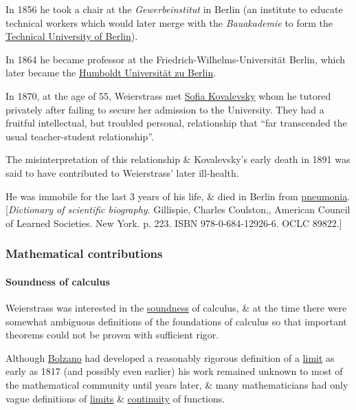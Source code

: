 \documentclass{article}
\begin{document}
In 1856 he took a chair at the \textit{Gewerbeinstitut} in Berlin (an institute to educate technical workers which would later merge with the \textit{Bauakademie} to form the \href{https://en.wikipedia.org/wiki/Technical_University_of_Berlin}{Technical University of Berlin}).

In 1864 he became professor at the Friedrich-Wilhelms-Universität Berlin, which later became the \href{https://en.wikipedia.org/wiki/Humboldt_University_of_Berlin}{Humboldt Universität zu Berlin}.

%
In 1870, at the age of 55, Weierstrass met \href{https://en.wikipedia.org/wiki/Sofia_Kovalevskaya}{Sofia Kovalevsky} whom he tutored privately after failing to secure her admission to the University.
They had a fruitful intellectual, but troubled personal, relationship that ``far transcended the usual teacher-student relationship''.

The misinterpretation of this relationship \& Kovalevsky's early death in 1891 was said to have contributed to Weierstrass' later ill-health.

He was immobile for the last 3 years of his life, \& died in Berlin from \href{https://en.wikipedia.org/wiki/Pneumonia}{pneumonia}.[\textit{Dictionary of scientific biography}. Gillispie, Charles Coulston,, American Council of Learned Societies. New York. p. 223. ISBN 978-0-684-12926-6. OCLC 89822.]

\subsubsection{Mathematical contributions}

\paragraph{Soundness of calculus}
Weierstrass was interested in the \href{https://en.wikipedia.org/wiki/Soundness}{soundness} of calculus, \& at the time there were somewhat ambiguous definitions of the foundations of calculus so that important theorems could not be proven with sufficient rigor.

Although \href{https://en.wikipedia.org/wiki/Bernard_Bolzano}{Bolzano} had developed a reasonably rigorous definition of a \href{https://en.wikipedia.org/wiki/Limit_of_a_function}{limit} as early as 1817 (and possibly even earlier) his work remained unknown to most of the mathematical community until years later, \& many mathematicians had only vague definitions of \href{https://en.wikipedia.org/wiki/Limit_of_a_function}{limits} \& \href{https://en.wikipedia.org/wiki/Continuous_function}{continuity} of functions.
\end{document}
